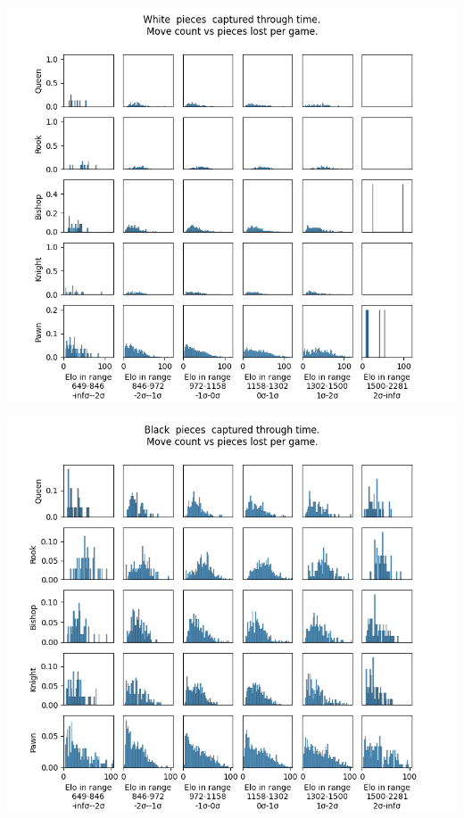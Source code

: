 \documentclass[11pt]{article}
\begin{document}
\begin{center}
\includegraphics[width=\textwidth]{Images/DaenaliaEvandruile_HIST_Queen_Rook_Bishop_Knight_Pawn_WHITE_ELO.png}
\end{center}

\begin{center}
\includegraphics[width=\textwidth]{Images/DaenaliaEvandruile_HIST_Queen_Rook_Bishop_Knight_Pawn_BLACK_ELO.png}
\end{center}
\end{document}
